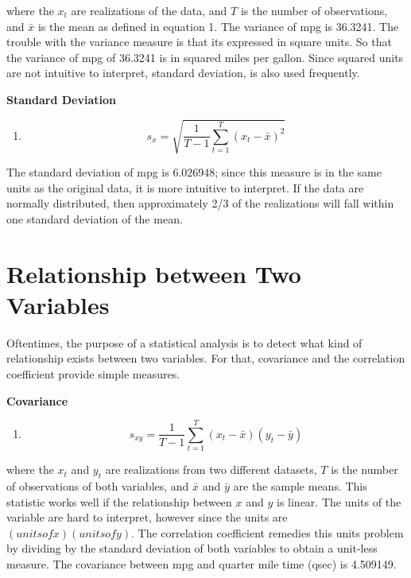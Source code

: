 \documentclass[]{book}
\providecommand{\tightlist}{%
  \setlength{\itemsep}{0pt}\setlength{\parskip}{0pt}}
\theoremstyle{definition}
\theoremstyle{definition}
\theoremstyle{remark}
\begin{document}
where the \(x_t\) are realizations of the data, and \(T\) is the number
of observations, and \(\bar{x}\) is the mean as defined in equation 1.
The variance of mpg is 36.3241. The trouble with the variance measure is
that its expressed in square units. So that the variance of mpg of
36.3241 is in squared miles per gallon. Since squared units are not
intuitive to interpret, standard deviation, is also used frequently.

\textbf{Standard Deviation}

\begin{enumerate}
\def\labelenumi{\arabic{enumi}.}
\setcounter{enumi}{3}
\tightlist
\item
  \[s_x = \sqrt{\frac{1}{T-1}\sum_{t=1}^{T} (x_t - \bar{x})^2}\]
\end{enumerate}

The standard deviation of mpg is 6.026948; since this measure is in the
same units as the original data, it is more intuitive to interpret. If
the data are normally distributed, then approximately 2/3 of the
realizations will fall within one standard deviation of the mean.

\section{Relationship between Two
Variables}\label{relationship-between-two-variables}

Oftentimes, the purpose of a statistical analysis is to detect what kind
of relationship exists between two variables. For that, covariance and
the correlation coefficient provide simple measures.

\textbf{Covariance}

\begin{enumerate}
\def\labelenumi{\arabic{enumi}.}
\setcounter{enumi}{4}
\tightlist
\item
  \[s_{xy} = \frac{1}{T-1}\sum_{t=1}^{T} (x_t - \bar{x})(y_t - \bar{y})\]
\end{enumerate}

where the \(x_t\) and \(y_t\) are realizations from two different
datasets, \(T\) is the number of observations of both variables, and
\(\bar{x}\) and \(\bar{y}\) are the sample means. This statistic works
well if the relationship between \(x\) and \(y\) is linear. The units of
the variable are hard to interpret, however since the units are
\((units of x)(units of y)\). The correlation coefficient remedies this
units problem by dividing by the standard deviation of both variables to
obtain a unit-less measure. The covariance between mpg and quarter mile
time (qsec) is 4.509149.
\end{document}
